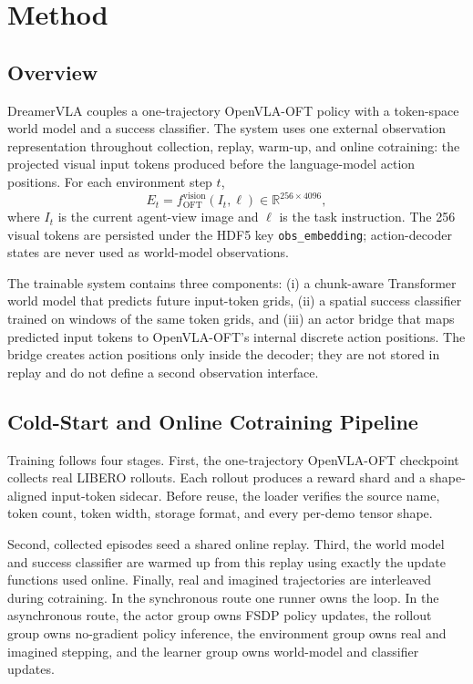 \section{Method}

\subsection{Overview}

DreamerVLA couples a one-trajectory OpenVLA-OFT policy with a token-space
world model and a success classifier.  The system uses one external observation
representation throughout collection, replay, warm-up, and online cotraining:
the projected visual input tokens produced before the language-model action
positions.  For each environment step $t$,
\[
E_t = f_{\mathrm{OFT}}^{\mathrm{vision}}(I_t,\ell)
    \in \mathbb{R}^{256\times4096},
\]
where $I_t$ is the current agent-view image and $\ell$ is the task instruction.
The 256 visual tokens are persisted under the HDF5 key
\texttt{obs\_embedding}; action-decoder states are never used as world-model
observations.

The trainable system contains three components: (i) a chunk-aware Transformer
world model that predicts future input-token grids, (ii) a spatial success
classifier trained on windows of the same token grids, and (iii) an actor bridge
that maps predicted input tokens to OpenVLA-OFT's internal discrete action
positions.  The bridge creates action positions only inside the decoder; they
are not stored in replay and do not define a second observation interface.

\subsection{Cold-Start and Online Cotraining Pipeline}

Training follows four stages.  First, the one-trajectory OpenVLA-OFT checkpoint
collects real LIBERO rollouts.  Each rollout produces a reward shard and a
shape-aligned input-token sidecar.  Before reuse, the loader verifies the source
name, token count, token width, storage format, and every per-demo tensor shape.

Second, collected episodes seed a shared online replay.  Third, the world model
and success classifier are warmed up from this replay using exactly the update
functions used online.  Finally, real and imagined trajectories are interleaved
during cotraining.  In the synchronous route one runner owns the loop.  In the
asynchronous route, the actor group owns FSDP policy updates, the rollout group
owns no-gradient policy inference, the environment group owns real and imagined
stepping, and the learner group owns world-model and classifier updates.

